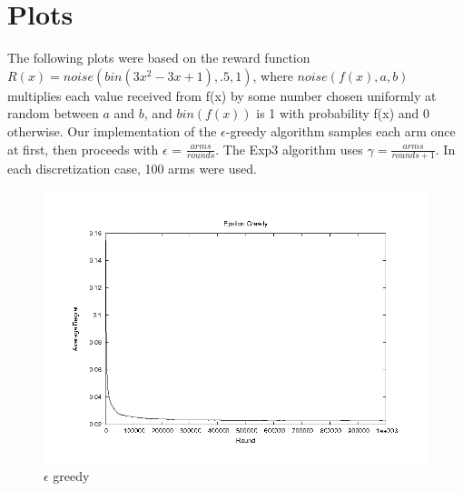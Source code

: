 \documentclass{article}
\begin{document}
\section{Plots}
The following plots were based on the reward function
$R(x) = noise(bin(3x^2 -3x + 1), .5, 1)$, where $noise(f(x), a, b)$
multiplies each value received from f(x) by some number chosen uniformly
at random between $a$ and $b$, and $bin(f(x))$ is 1 with probability
f(x) and 0 otherwise.  Our implementation of the $\epsilon$-greedy 
algorithm samples each arm once at first, then proceeds with
$\epsilon$ = $\frac{arms}{rounds}$.  The Exp3 algorithm uses
$\gamma = \frac{arms}{rounds + 1}$.  In each discretization case, 100
arms were used.

\newcommand{\figwidth}{5in}


\begin{figure}[htb]
  \begin{center}
    \includegraphics[width=\figwidth]{images/e_greed.png}
     \caption{$\epsilon$ greedy}
     \label{fig:egreed}
  \end{center}
\end{figure}
\end{document}
